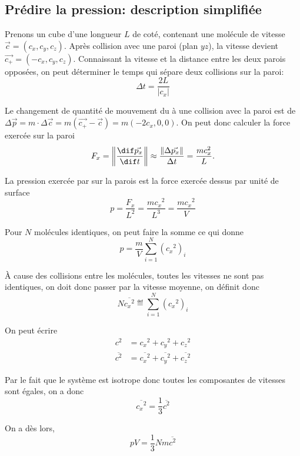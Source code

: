 \subsection{Prédire la pression: description simplifiée}
Prenons un cube d'une longueur $L$ de coté,
contenant une molécule de vitesse $\vec{c} = (c_x, c_y, c_z)$.
Après collision avec une paroi (plan $yz$),
la vitesse devient $\vec{c_+} = (-c_x, c_y, c_z)$.
Connaissant la vitesse et la distance entre les deux parois opposées,
on peut déterminer le temps qui sépare deux collisions sur la paroi:
\[ \Delta t = \frac{2L}{|c_x|} \]

Le changement de quantité de mouvement du à une collision avec
la paroi est de $\Delta \vec{p} = m \cdot \Delta \vec{c}
= m (\vec{c_+} - \vec{c}) = m(-2c_x, 0, 0)$.
On peut donc calculer la force exercée sur la paroi
\[ F_x = \left\|\frac{\dif \vec{p_x}}{\dif t}\right\| \approx
\frac{\|\Delta \vec{p_x}\|}{\Delta t} = \frac{mc_x^2}{L}. \]

La pression exercée par  sur la parois est
la force exercée dessus par unité de surface
\[ p = \frac{F_x}{L^2} = \frac{m{c_x}^2}{L^3} = \frac{m{c_x}^2}{V} \]

Pour $N$ molécules identiques, on peut faire la somme ce qui donne
\[ p = \frac{m}{V} \sum_{i=1}^{N}{({c_x}^2)_i} \]

À cause des collisions entre les molécules,
toutes les vitesses ne sont pas identiques,
on doit donc passer par la vitesse moyenne, on définit donc
\[ N \overline{{c_x}^2} \eqdef \sum_{i=1}^{N}{({c_x}^2)_i} \]

On peut écrire
\begin{align*}
  c^2 & = {c_x}^2 + {c_y}^2 + {c_z}^2\\
  \overline{c^2} & =
  \overline{{c_x}^2} + \overline{{c_y}^2} + \overline{{c_z}^2}
\end{align*}

Par le fait que le système est isotrope donc
toutes les composantes de vitesses sont égales, on a donc
\[  \overline{{c_x}^2} = \frac{1}{3}\overline{c^2} \]

On a dès lors,
\[ pV = \frac{1}{3}Nm\overline{c^2} \]


